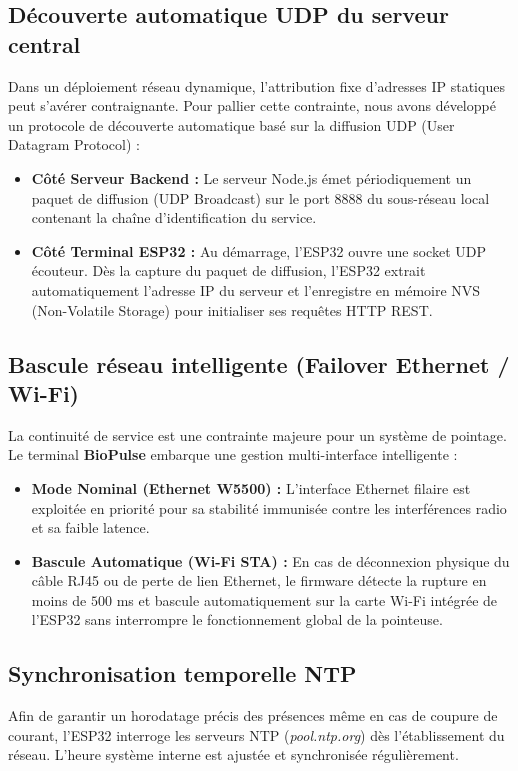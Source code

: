 \documentclass[12pt,a4paper]{report}
\begin{document}
\subsection{Découverte automatique UDP du serveur central}
Dans un déploiement réseau dynamique, l'attribution fixe d'adresses IP statiques peut s'avérer contraignante. Pour pallier cette contrainte, nous avons développé un protocole de découverte automatique basé sur la diffusion UDP (User Datagram Protocol) :
\begin{itemize}
    \item \textbf{Côté Serveur Backend :} Le serveur Node.js émet périodiquement un paquet de diffusion (UDP Broadcast) sur le port $8888$ du sous-réseau local contenant la chaîne d'identification du service.
    \item \textbf{Côté Terminal ESP32 :} Au démarrage, l'ESP32 ouvre une socket UDP écouteur. Dès la capture du paquet de diffusion, l'ESP32 extrait automatiquement l'adresse IP du serveur et l'enregistre en mémoire NVS (Non-Volatile Storage) pour initialiser ses requêtes HTTP REST.
\end{itemize}

\subsection{Bascule réseau intelligente (Failover Ethernet / Wi-Fi)}
La continuité de service est une contrainte majeure pour un système de pointage. Le terminal \textbf{BioPulse} embarque une gestion multi-interface intelligente :
\begin{itemize}
    \item \textbf{Mode Nominal (Ethernet W5500) :} L'interface Ethernet filaire est exploitée en priorité pour sa stabilité immunisée contre les interférences radio et sa faible latence.
    \item \textbf{Bascule Automatique (Wi-Fi STA) :} En cas de déconnexion physique du câble RJ45 ou de perte de lien Ethernet, le firmware détecte la rupture en moins de $500$ ms et bascule automatiquement sur la carte Wi-Fi intégrée de l'ESP32 sans interrompre le fonctionnement global de la pointeuse.
\end{itemize}

\subsection{Synchronisation temporelle NTP}
Afin de garantir un horodatage précis des présences même en cas de coupure de courant, l'ESP32 interroge les serveurs NTP (\emph{pool.ntp.org}) dès l'établissement du réseau. L'heure système interne est ajustée et synchronisée régulièrement.
\end{document}
